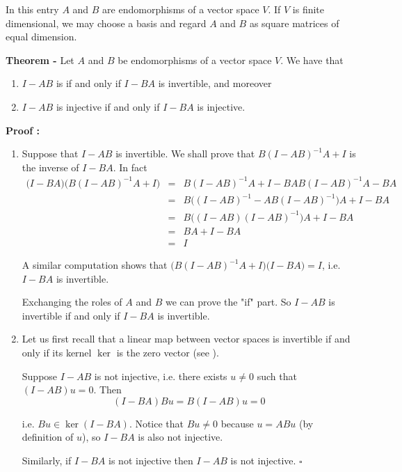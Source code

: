 \documentclass[12pt]{article}
\begin{document}

In this entry $A$ and $B$ are endomorphisms of a vector space $V$. If $V$ is finite dimensional, we may choose a basis and regard $A$ and $B$ as square matrices of equal dimension.

{\bf Theorem -} Let $A$ and $B$ be endomorphisms of a vector space $V$. We have that
\begin{enumerate}
\item $I-AB$ is  if and only if $I-BA$ is invertible, and moreover
\item $I-AB$ is injective if and only if $I-BA$ is injective.
\end{enumerate}

{\bf Proof :}
\begin{enumerate}
\item Suppose that $I-AB$ is invertible. We shall prove that $B(I-AB)^{-1}A +I$ is the inverse of $I-BA$.
 In fact
\begin{eqnarray*}
\Big(I-BA\Big)\Big(B(I-AB)^{-1}A +I\Big) &=& B(I-AB)^{-1}A + I - BAB(I-AB)^{-1}A - BA\\
&=& B \Big((I-AB)^{-1} - AB(I-AB)^{-1}\Big)A + I - BA\\
&=& B \Big((I-AB)(I-AB)^{-1}\Big)A + I -BA\\
&=& BA + I - BA\\
&=& I
\end{eqnarray*}

A similar computation shows that $\Big(B(I-AB)^{-1}A +I\Big)\Big(I-BA\Big) = I$, i.e. $I - BA$ is invertible.

Exchanging the roles of $A$ and $B$ we can prove the "if" part. So $I-AB$ is invertible if and only if $I - BA$ is invertible.

\item Let us first 
recall that a linear map between vector spaces is
invertible if and only if its kernel $\operatorname{ker}$
is the zero vector (see ).

Suppose $I - AB$ is not injective, i.e. there exists $u \neq 0$ such that $(I-AB)u=0$. Then
\begin{displaymath}
(I-BA)Bu = B(I-AB)u = 0
\end{displaymath}

i.e. $Bu \in \operatorname{ker}(I-BA)$. Notice that $Bu \neq 0$ because $u = ABu$ (by definition of $u$), so 
$I-BA$ is also not injective.

Similarly, if $I-BA$ is not injective then $I - AB$ is not injective. $\square$

\end{enumerate}
\end{document}
